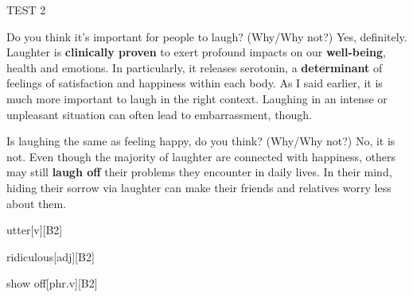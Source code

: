 \begin{glossarymc}[Cambridge 7]
\begin{test}{TEST 2}
    \begin{qa}{Do you think it's important for people to laugh? (Why/Why not?)}
    Yes, definitely. Laughter is \textbf{clinically proven} to exert profound impacts on our \textbf{well-being}, health and emotions. In particularly, it releases serotonin, a \textbf{determinant} of feelings of satisfaction and happiness within each body. As I said earlier, it is much more important to laugh in the right context. Laughing in an intense or unpleasant situation can often lead to embarrassment, though.
    \end{qa}

    \begin{qa}{Is laughing the same as feeling happy, do you think? (Why/Why not?)}
    No, it is not. Even though the majority of laughter are connected with happiness, others may still \textbf{laugh off} their problems they encounter in daily lives. In their mind, hiding their sorrow via laughter can make their friends and relatives worry less about them.
    \end{qa}
        \begin{VocabExplain}[Part 1]
            \begin{ExplainCard}{utter}[v][B2]
            \end{ExplainCard}

            \begin{ExplainCard}{ridiculous}[adj][B2]
            \end{ExplainCard}

            \begin{ExplainCard}{show off}[phr.v][B2]
            \end{ExplainCard}


\end{VocabExplain}
\end{test}
\end{glossarymc}
